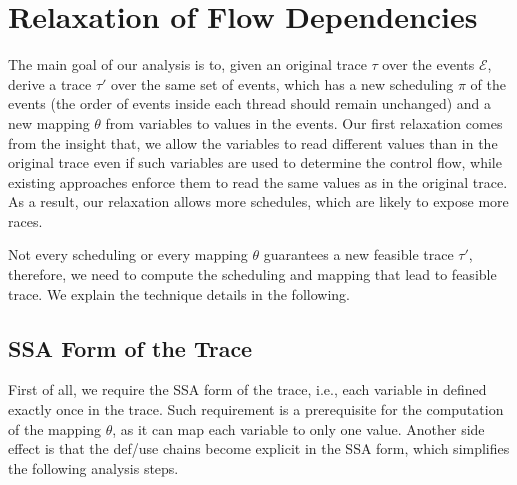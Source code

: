 \section{Relaxation of Flow Dependencies}
The main goal of our analysis is to, given an original trace $\tau$ over the events $\mathcal{E}$, derive a trace $\tau'$ over the same set of events, which has a new scheduling $\pi$ of the events (the order of events inside each thread should remain unchanged) and a new mapping $\theta$ from variables to values in the events. Our first relaxation comes from the insight that, we allow the variables to read different values than in the original trace even if such variables are used to determine the control flow, while existing approaches enforce them to read the same values as in the original trace. As a result, our relaxation allows more schedules, which are likely to expose more races.
 
Not every scheduling or every mapping $\theta$ guarantees a new feasible trace $\tau'$, therefore, we need to compute the scheduling and mapping that lead to feasible trace. We explain the technique details in the following.





\subsection{SSA Form of the Trace}
First of all, we require the SSA form of the trace, i.e., each variable in defined exactly once in the trace. Such requirement is a prerequisite for the computation of the mapping $\theta$, as it can map each variable to only one value. Another side effect is that the def/use chains become explicit in the SSA form, which simplifies the following analysis steps.


